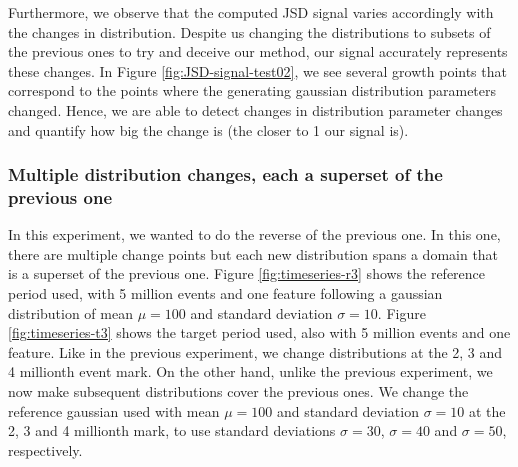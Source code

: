 Furthermore, we observe that the computed JSD signal varies accordingly with the changes in distribution. Despite us changing the distributions to subsets of the previous ones to try and deceive our method, our signal accurately represents these changes. In Figure \ref{fig:JSD-signal-test02}, we see several growth points that correspond to the points where the generating gaussian distribution parameters changed. Hence, we are able to detect changes in distribution parameter changes and quantify how big the change is (the closer to 1 our signal is).

\subsubsection{Multiple distribution changes, each a superset of the previous one}
In this experiment, we wanted to do the reverse of the previous one. In this one, there are multiple change points but each new distribution spans a domain that is a superset of the previous one. Figure \ref{fig:timeseries-r3} shows the reference period used, with 5 million events and one feature following a gaussian distribution of mean $\mu=100$ and standard deviation $\sigma=10$. Figure \ref{fig:timeseries-t3} shows the target period used, also with 5 million events and one feature. Like in the previous experiment, we change distributions at the 2, 3 and 4 millionth event mark. On the other hand, unlike the previous experiment, we now make subsequent distributions cover the previous ones. We change the reference gaussian used with mean $\mu=100$ and standard deviation $\sigma=10$ at the 2, 3 and 4 millionth mark, to use standard deviations $\sigma=30$, $\sigma=40$ and $\sigma=50$, respectively.

